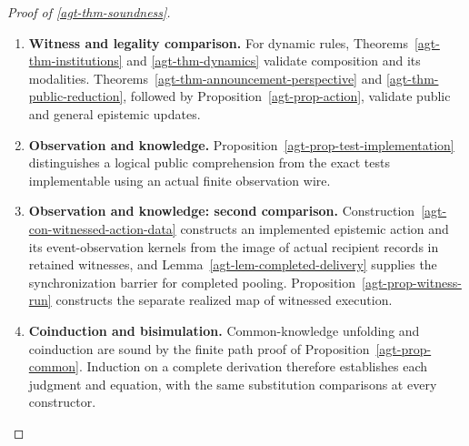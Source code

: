 \documentclass[11pt,a4paper]{article}
\numberwithin{equation}{section}
\theoremstyle{definition}
\theoremstyle{remark}
\theoremstyle{plain}
\begin{document}
\begin{proof}[Proof of \cref{agt-thm-soundness}]
\begin{enumerate}[label=\textup{(\arabic*)},leftmargin=*,itemsep=4pt,topsep=3pt]
are subobjects defined by the proved graph adjunction and inverse-image
equations. Hence their rules are sound comprehensions and quantifications.
  \item \textbf{Witness and legality comparison.} For dynamic rules, Theorems~\ref{agt-thm-institutions} and
\ref{agt-thm-dynamics} validate composition and its modalities. Theorems~\ref{agt-thm-announcement-perspective} and
\ref{agt-thm-public-reduction}, followed by
Proposition~\ref{agt-prop-action}, validate public and general epistemic
updates.
  \item \textbf{Observation and knowledge.} Proposition~\ref{agt-prop-test-implementation} distinguishes a
logical public comprehension from the exact tests implementable using
an actual finite observation wire.
  \item \textbf{Observation and knowledge: second comparison.} Construction~\ref{agt-con-witnessed-action-data}
constructs an implemented epistemic action and its event-observation
kernels from the image of actual recipient records in retained witnesses, and Lemma~\ref{agt-lem-completed-delivery}
supplies the synchronization barrier for completed pooling. Proposition~\ref{agt-prop-witness-run} constructs the separate realized
map of witnessed execution.
  \item \textbf{Coinduction and bisimulation.} Common-knowledge unfolding and coinduction are sound by the finite
path proof of Proposition~\ref{agt-prop-common}. Induction on a complete
derivation therefore establishes each judgment and equation, with the same
substitution comparisons at every constructor.
\end{enumerate}
\end{proof}
\end{document}
